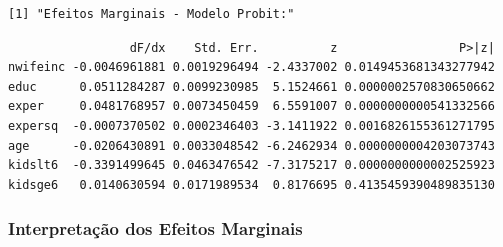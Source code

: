 \documentclass[
  letterpaper,
  DIV=11,
  numbers=noendperiod]{scrartcl}
\newenvironment{Shaded}{\begin{snugshade}}{\end{snugshade}}
\newcommand{\NormalTok}[1]{\textcolor[rgb]{0.00,0.23,0.31}{#1}}
\newcommand{\SpecialCharTok}[1]{\textcolor[rgb]{0.37,0.37,0.37}{#1}}
\begin{document}
\begin{verbatim}
[1] "Efeitos Marginais - Modelo Probit:"
\end{verbatim}

\begin{Shaded}
\end{Shaded}

\begin{verbatim}
                 dF/dx    Std. Err.          z                 P>|z|
nwifeinc -0.0046961881 0.0019296494 -2.4337002 0.0149453681343277942
educ      0.0511284287 0.0099230985  5.1524661 0.0000002570830650662
exper     0.0481768957 0.0073450459  6.5591007 0.0000000000541332566
expersq  -0.0007370502 0.0002346403 -3.1411922 0.0016826155361271795
age      -0.0206430891 0.0033048542 -6.2462934 0.0000000004203073743
kidslt6  -0.3391499645 0.0463476542 -7.3175217 0.0000000000002525923
kidsge6   0.0140630594 0.0171989534  0.8176695 0.4135459390489835130
\end{verbatim}

\subsubsection{Interpretação dos Efeitos
Marginais}\label{interpretauxe7uxe3o-dos-efeitos-marginais}
\end{document}
